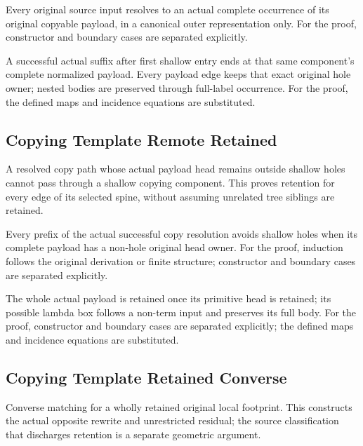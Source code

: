 Every original source input resolves to an actual complete occurrence of its original copyable payload, in a canonical outer representation only.
For the proof, constructor and boundary cases are separated explicitly.
\par{}

A successful actual suffix after first shallow entry ends at that same component's complete normalized payload. Every payload edge keeps that exact original hole owner; nested bodies are preserved through full-label occurrence.
For the proof, the defined maps and incidence equations are substituted.
\par{}

\subsection{Copying Template Remote Retained}
A resolved copy path whose actual payload head remains outside shallow holes cannot pass through a shallow copying component. This proves retention for every edge of its selected spine, without assuming unrelated tree siblings are retained.

Every prefix of the actual successful copy resolution avoids shallow holes when its complete payload has a non-hole original head owner.
For the proof, induction follows the original derivation or finite structure; constructor and boundary cases are separated explicitly.
\par{}

The whole actual payload is retained once its primitive head is retained; its possible lambda box follows a non-term input and preserves its full body.
For the proof, constructor and boundary cases are separated explicitly; the defined maps and incidence equations are substituted.
\par{}

\subsection{Copying Template Retained Converse}
Converse matching for a wholly retained original local footprint. This constructs the actual opposite rewrite and unrestricted residual; the source classification that discharges retention is a separate geometric argument.


